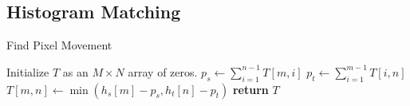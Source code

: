%


\subsection{Histogram Matching}
%  
{ \footnotesize
\begin{algorithm}
 \caption{Find Pixel Movement } 
 \label{alg:ehm}
 \begin{algorithmic}
	\footnotesize
    \State Initialize $T$ as an $M \times N$ array of zeros.
        \State $p_s \gets \sum_{i=1}^{n-1} T[m, i]$
        \State $p_t \gets \sum_{i=1}^{m-1} T[i, n]$
        \State $T[m, n] \gets \min(h_s[m] - p_s, h_t[n] - p_t)$
      \EndFor
    \EndFor
    \State \textbf{return} $T$
  \EndProcedure
 \end{algorithmic}
\end{algorithm}
}

